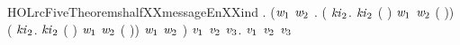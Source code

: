 \begin{SaveVerbatim}{HOLrcFiveTheoremshalfXXmessageEnXXind}
\HOLTokenTurnstile{} \HOLSymConst{\HOLTokenForall{}}. (\HOLSymConst{\HOLTokenForall{}}\ensuremath{\HOLBoundVar{w}\sb{\mathrm{1}}} \ensuremath{\HOLBoundVar{w}\sb{\mathrm{2}}}  .
          (\HOLSymConst{\HOLTokenForall{}} \ensuremath{\HOLBoundVar{ki}\sb{\mathrm{2}}}.
              \HOLSymConst{=}    \HOLSymConst{\HOLTokenConj{}} \ensuremath{\HOLBoundVar{ki}\sb{\mathrm{2}}} \HOLSymConst{=}  ( \HOLSymConst{\ensuremath{-}} )  \HOLSymConst{\HOLTokenConj{}}  \HOLSymConst{\HOLTokenNotEqual{}}  \HOLSymConst{\HOLTokenConj{}}  \HOLSymConst{\HOLTokenNotEqual{}}  \HOLSymConst{\HOLTokenImp{}}
              \ensuremath{\HOLBoundVar{w}\sb{\mathrm{1}}} \ensuremath{\HOLBoundVar{w}\sb{\mathrm{2}}}  ( \HOLSymConst{\ensuremath{-}} )) \HOLSymConst{\HOLTokenConj{}}
          (\HOLSymConst{\HOLTokenForall{}} \ensuremath{\HOLBoundVar{ki}\sb{\mathrm{2}}}.
              \HOLSymConst{=}    \HOLSymConst{\HOLTokenConj{}} \ensuremath{\HOLBoundVar{ki}\sb{\mathrm{2}}} \HOLSymConst{=}  ( \HOLSymConst{\ensuremath{-}} )  \HOLSymConst{\HOLTokenConj{}}  \HOLSymConst{\HOLTokenNotEqual{}}  \HOLSymConst{\HOLTokenConj{}}  \HOLSymConst{\HOLTokenNotEqual{}}  \HOLSymConst{\HOLTokenImp{}}
              \ensuremath{\HOLBoundVar{w}\sb{\mathrm{1}}} \ensuremath{\HOLBoundVar{w}\sb{\mathrm{2}}}  ( \HOLSymConst{\ensuremath{-}} )) \HOLSymConst{\HOLTokenImp{}}
           \ensuremath{\HOLBoundVar{w}\sb{\mathrm{1}}} \ensuremath{\HOLBoundVar{w}\sb{\mathrm{2}}}  ) \HOLSymConst{\HOLTokenImp{}}
       \HOLSymConst{\HOLTokenForall{}} \ensuremath{\HOLBoundVar{v}\sb{\mathrm{1}}} \ensuremath{\HOLBoundVar{v}\sb{\mathrm{2}}} \ensuremath{\HOLBoundVar{v}\sb{\mathrm{3}}}.   \ensuremath{\HOLBoundVar{v}\sb{\mathrm{1}}} \ensuremath{\HOLBoundVar{v}\sb{\mathrm{2}}} \ensuremath{\HOLBoundVar{v}\sb{\mathrm{3}}}
\end{SaveVerbatim}
\newcommand{\HOLrcFiveTheoremshalfXXmessageEnXXind}{\UseVerbatim{HOLrcFiveTheoremshalfXXmessageEnXXind}}
